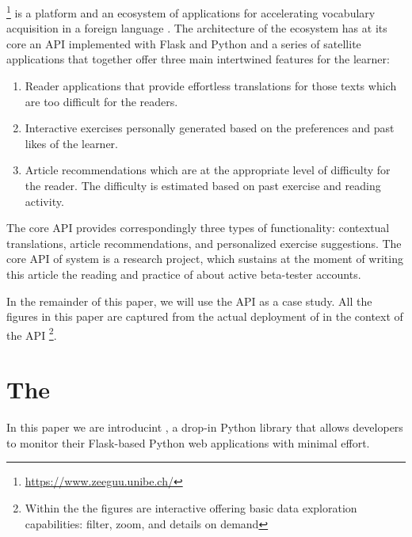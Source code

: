 \documentclass[conference]{IEEEtran}
\begin{document}
  \zee\footnote{\url{https://www.zeeguu.unibe.ch/}} is a platform and an ecosystem of applications for accelerating vocabulary acquisition in a foreign language \cite{Lungu16}. 
%
  The architecture of the ecosystem has at its core an API implemented with Flask and Python and a series of satellite applications that together offer three main intertwined features for the learner:

  \begin{enumerate}

    \item Reader applications that provide effortless translations for those texts which are too difficult for the readers.

    \item Interactive exercises personally generated based on the preferences and past likes of the learner.

    \item Article recommendations which are at the appropriate level of difficulty for the reader. The difficulty is estimated based on past exercise and reading activity.

  \end{enumerate}

  The core API provides correspondingly three types of functionality: contextual translations, article recommendations, and personalized exercise suggestions. The core API of system is a research project, which sustains at the moment of writing this article the reading and practice of about \activeUserCount active beta-tester accounts. 

  In the remainder of this paper, we will use the \zee API as a case study. All the figures in this paper are captured from the actual deployment of \tool in the context of the \zee API \footnote{Within the \tool the figures are interactive offering basic data exploration capabilities: filter, zoom, and details on demand\cite{Shne99a}}.





\section{The \tool}
  In this paper we are introducint \tool, a drop-in Python library that allows developers to monitor their Flask-based Python web applications with minimal effort.
\end{document}
